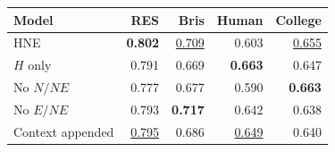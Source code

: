\begin{tabular*}{\linewidth}{@{\extracolsep{\fill}}lrrrr@{}}
\toprule
Model & RES & Bris & Human & College \\
\midrule
\cellcolor{hnegray}HNE & \textbf{0.802} & \underline{0.709} & 0.603 & \underline{0.655} \\
$H$ only & 0.791 & 0.669 & \textbf{0.663} & 0.647 \\
No $N/NE$ & 0.777 & 0.677 & 0.590 & \textbf{0.663} \\
No $E/NE$ & 0.793 & \textbf{0.717} & 0.642 & 0.638 \\
Context appended & \underline{0.795} & 0.686 & \underline{0.649} & 0.640 \\
\bottomrule
\end{tabular*}